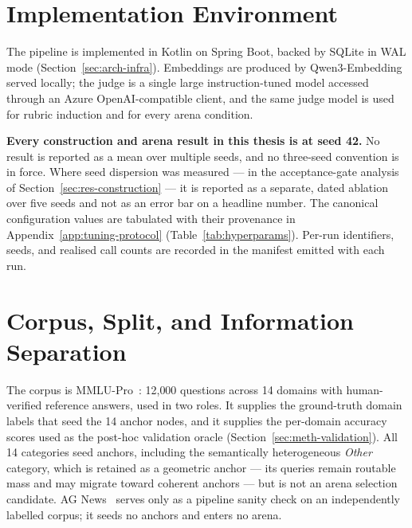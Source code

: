 \section{Implementation Environment}\label{sec:exp-env}

The pipeline is implemented in Kotlin on Spring Boot, backed by SQLite
in WAL mode (Section~\ref{sec:arch-infra}). Embeddings are produced by
Qwen3-Embedding served locally; the judge is a single large
instruction-tuned model accessed through an Azure OpenAI-compatible
client, and the same judge model is used for rubric induction and for
every arena condition.

\textbf{Every construction and arena result in this thesis is at seed
42.} No result is reported as a mean over multiple seeds, and no
three-seed convention is in force. Where seed dispersion was measured
--- in the acceptance-gate analysis of
Section~\ref{sec:res-construction} --- it is reported as a separate,
dated ablation over five seeds and not as an error bar on a headline
number.
The canonical configuration values are tabulated with their provenance
in Appendix~\ref{app:tuning-protocol}
(Table~\ref{tab:hyperparams}). Per-run identifiers, seeds, and realised
call counts are recorded in the manifest emitted with each run.


\section{Corpus, Split, and Information Separation}\label{sec:exp-datasets}

The corpus is MMLU-Pro~\parencite{wang2024mmlupro}: 12{,}000 questions
across 14 domains with human-verified reference answers, used in two
roles. It supplies the ground-truth domain labels that seed the 14
anchor nodes, and it supplies the per-domain accuracy scores used as
the post-hoc validation oracle (Section~\ref{sec:meth-validation}).
All 14 categories seed anchors, including the semantically
heterogeneous \textit{Other} category, which is retained as a geometric
anchor --- its queries remain routable mass and may migrate toward
coherent anchors --- but is not an arena selection candidate.
AG News~\parencite{zhang2015agnews} serves only as a pipeline sanity
check on an independently labelled corpus; it seeds no anchors and
enters no arena.


